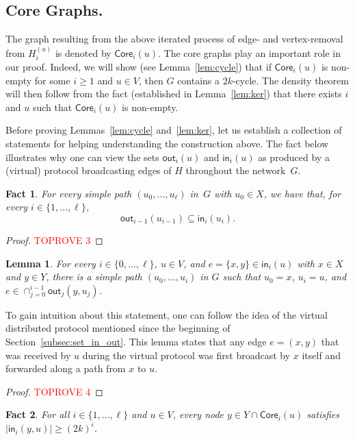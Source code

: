 \documentclass{article}
\newcommand{\F}{{\mathsf{out}}}
\renewcommand{\H}{{\mathsf{in}}}
\newcommand{\bp}{X}
\newcommand{\tp}{Y}
\newtheorem{lemma}{Lemma}
\newtheorem{fact}{Fact}
\begin{document}
\subsection{Core Graphs.} The graph resulting from the above iterated process of edge- and vertex-removal from $H_i^{(u)}$ is denoted by $\mathsf{Core}_i(u)$. 
The core graphs play an important role in our proof. Indeed, we will show (see Lemma~\ref{lem:cycle}) that if $\mathsf{Core}_i(u)$ is non-empty for some $i\geq 1$ and $u\in V$, then $G$ contains a $2k$-cycle. The density theorem will then follow from the fact (established in  Lemma~\ref{lem:ker}) that there exists $i$ and $u$ such that $\mathsf{Core}_i(u)$ is non-empty. 

\medbreak

Before proving Lemmas~\ref{lem:cycle} and~\ref{lem:ker}, let us establish a collection of statements for helping understanding the construction above. The fact below illustrates why one can view the sets $\F_i(u)$ and $\H_i(u)$ as produced by a (virtual)  protocol broadcasting edges of $H$ throughout the network~$G$. 

\begin{fact}\label{fact:OUT_to_IN}
    For every simple path $(u_0,\dots,u_\ell)$ in~$G$ with $u_0\in \bp$, we have that, for every $i\in\{1,\dots,\ell\}$, \[\F_{i-1}(u_{i-1})\subseteq\H_i(u_i).\]
\end{fact}

\begin{proof}\textcolor{red}{TOPROVE 3}\end{proof}

\begin{lemma}\label{lem:path_to_z}
    For every $i\in\{0,\dots,\ell\}$, $u\in V$, and $e=\{x,y\} \in \H_i(u)$ with $x\in \bp$ and $y\in \tp$, there is a simple path $(u_0,\dots,u_i)$ in $G$ such that $u_0=x$, $u_i=u$, and $e \in \cap_{j=0}^{i-1} \F_j(y,u_j)$.
\end{lemma}

To gain intuition about this statement, one can follow the idea of the virtual distributed protocol mentioned since the beginning of Section~\ref{subsec:set_in_out}. This lemma states that any edge $e=(x,y)$ that was received by $u$ during the virtual protocol was first broadcast by $x$ itself and forwarded along a path from $x$ to $u$.

\begin{proof}\textcolor{red}{TOPROVE 4}\end{proof}

\begin{fact}\label{fact:deg_F}
    For all $i\in\{1,\dots,\ell\}$ and $u\in V$, every node $y \in \tp \cap \mathsf{Core}_i(u)$ satisfies $|\H_i(y,u)|\geq (2k)^i$.
\end{fact}
\end{document}
